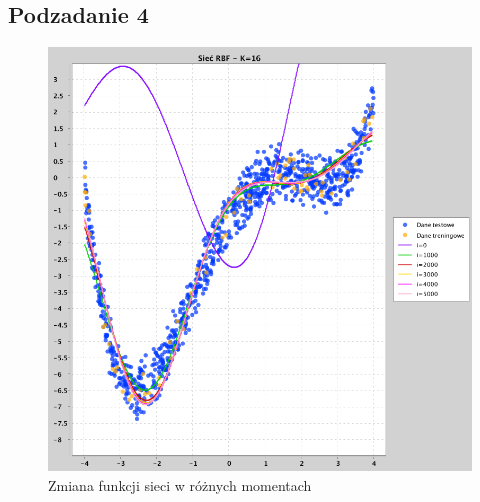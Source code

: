 \documentclass[a4paper, portrait,11pt]{article}
\begin{document}
\subsection{Podzadanie 4}
\begin{figure}[!htb]
  \centering
  \begin{minipage}{0.5\textwidth}
    \includegraphics[width=1\linewidth]{../data/approximation3/4/chart.png}
    \caption{Zmiana funkcji sieci w różnych momentach}
  \end{minipage}\hfill
\end{figure}
\end{document}
